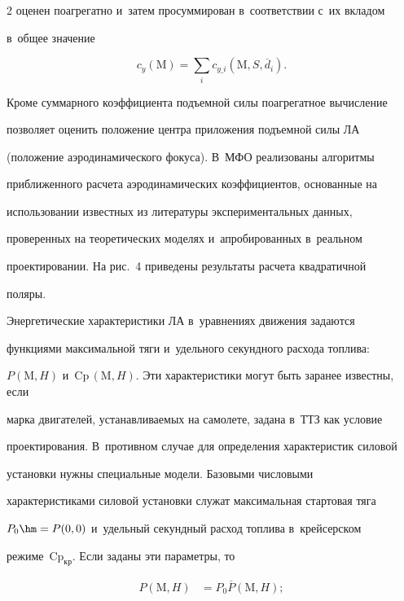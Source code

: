 \begin{multicols}{2}
оценен поагрегатно и~затем просуммирован в~соответствии с~их вкладом 


в~общее значение 


$$


c_y(\mathrm{M})= \sum\limits_i c_{y\_i}\left(\mathrm{M},S,\overline{d}_i\right).


$$ 


Кроме суммарного коэффициента подъемной силы поагрегатное вычисление 


поз\-во\-ля\-ет оценить положение цент\-ра приложения подъемной силы ЛА 


(\mbox{положение} аэродинамического фокуса). В~МФО реализованы алгоритмы 


приближенного расчета аэродинамических коэффициентов, основанные на 


использовании известных из литературы экспериментальных данных, 


проверенных на тео\-ре\-ти\-че\-ских моделях и~апробированных в~реальном 


проектировании. На рис.~4 приведены результаты расчета квад\-ра\-тич\-ной 


по\-ляры.


  








  Энергетические характеристики ЛА в~уравнениях движения задаются 


функциями максимальной тяги и~удельного секундного расхода топлива: 


$P(\mathrm{M},H)$ и~$\mathrm{Cp}\,(\mathrm{M},H)$. Эти характеристики могут быть заранее известны, если 


марка двигателей, уста\-нав\-ли\-ва\-емых на самолете, задана в~ТТЗ как условие 


проектирования. В~противном случае для определения характеристик силовой 


установки нужны специальные модели. Базовыми чис\-ло\-вы\-ми 


характеристиками силовой установки служат максимальная стартовая тяга 


$P_0\hm= P(0,0)$ и~удельный секундный расход топ\-ли\-ва в~крейсерском 


режиме~$\mathrm{Cp}_{\mathrm{кр}}$. Если заданы эти па\-ра\-мет\-ры, то


\begin{align*}


  P(\mathrm{M},H)&=P_0\overline{P}(\mathrm{M},H);\\



\end{align*}
\end{multicols}
